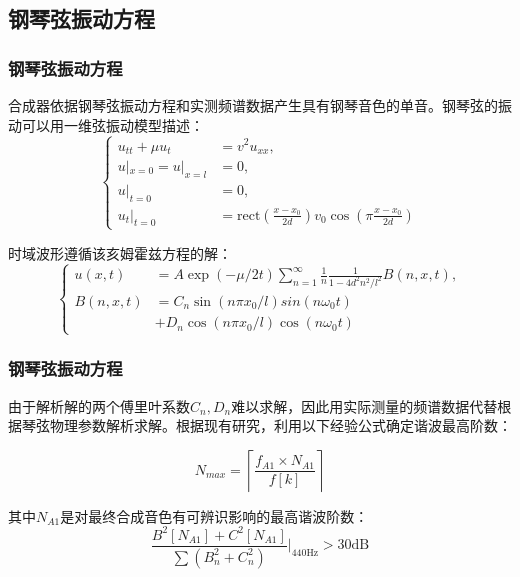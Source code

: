 \documentclass[utf8,10pt]{beamer}
\begin{document}
\subsection{钢琴弦振动方程}
\begin{frame}
    \frametitle{钢琴弦振动方程}

    合成器依据钢琴弦振动方程和实测频谱数据产生具有钢琴音色的单音。钢琴弦的振动可以用一维弦振动模型描述：
    \begin{equation}
        \begin{cases}
            u_{tt}+\mu u_{t}  & =v^{2}u_{xx},                                                                               \\
            u|_{x=0}=u|_{x=l} & =0,                                                                                         \\
            u|_{t=0}          & =0,                                                                                         \\
            u_{t}|_{t=0}      & =\text{rect}\left( \frac{x-x_{0}}{2d} \right)v_{0}\cos\left( \pi \frac{x-x_{0}}{2d} \right)
        \end{cases}
    \end{equation}

    时域波形遵循该亥姆霍兹方程的解：
    \begin{equation}
        \begin{cases}
            u(x,t)   & =A\exp(-\mu/2 t) \sum_{n=1}^{\infty} \frac{1}{n}\frac{1}{1-4d^2n^2/l^2}B(n,x,t), \\
            B(n,x,t) & =C_{n}\sin(n\pi x_{0}/l)sin(n\omega_0 t)                                         \\
                     & +D_{n}\cos(n\pi x_{0}/l)\cos(n\omega_0 t)
        \end{cases}
    \end{equation}

\end{frame}

\begin{frame}
    \frametitle{钢琴弦振动方程}

    由于解析解的两个傅里叶系数\(C_n,D_n\)难以求解，因此用实际测量的频谱数据代替根据琴弦物理参数解析求解。根据现有研究，利用以下经验公式确定谐波最高阶数：

    \begin{equation}
        N_{max}=\left\lceil \frac{f_{A1}\times N_{A1}}{f[k]} \right\rceil
    \end{equation}

    其中\(N_{A1}\)是对最终合成音色有可辨识影响的最高谐波阶数：
    \begin{equation}
        \frac{B^{2}[N_{A1}]+C^{2}[N_{A1}]}{\sum(B_{n}^{2}+C_{n}^{2})}\lvert_{440\text{Hz}}>30\text{dB}
    \end{equation}

\end{frame}
\end{document}
